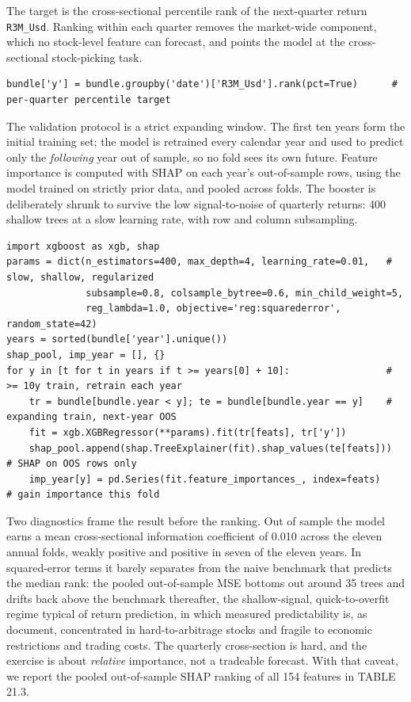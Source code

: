 The target is the cross-sectional percentile rank of the next-quarter return \texttt{R3M\_Usd}. Ranking within each quarter removes the market-wide component, which no stock-level feature can forecast, and points the model at the cross-sectional stock-picking task.

\begin{verbatim}
bundle['y'] = bundle.groupby('date')['R3M_Usd'].rank(pct=True)      # per-quarter percentile target
\end{verbatim}

The validation protocol is a strict expanding window. The first ten years form the initial training set; the model is retrained every calendar year and used to predict only the \textit{following} year out of sample, so no fold sees its own future. Feature importance is computed with SHAP on each year's out-of-sample rows, using the model trained on strictly prior data, and pooled across folds. The booster is deliberately shrunk to survive the low signal-to-noise of quarterly returns: 400 shallow trees at a slow learning rate, with row and column subsampling.

\begin{verbatim}
import xgboost as xgb, shap
params = dict(n_estimators=400, max_depth=4, learning_rate=0.01,   # slow, shallow, regularized
              subsample=0.8, colsample_bytree=0.6, min_child_weight=5,
              reg_lambda=1.0, objective='reg:squarederror', random_state=42)
years = sorted(bundle['year'].unique())
shap_pool, imp_year = [], {}
for y in [t for t in years if t >= years[0] + 10]:                 # >= 10y train, retrain each year
    tr = bundle[bundle.year < y]; te = bundle[bundle.year == y]    # expanding train, next-year OOS
    fit = xgb.XGBRegressor(**params).fit(tr[feats], tr['y'])
    shap_pool.append(shap.TreeExplainer(fit).shap_values(te[feats]))    # SHAP on OOS rows only
    imp_year[y] = pd.Series(fit.feature_importances_, index=feats)      # gain importance this fold
\end{verbatim}

Two diagnostics frame the result before the ranking. Out of sample the model earns a mean cross-sectional information coefficient of 0.010 across the eleven annual folds, weakly positive and positive in seven of the eleven years. In squared-error terms it barely separates from the naive benchmark that predicts the median rank: the pooled out-of-sample MSE bottoms out around 35 trees and drifts back above the benchmark thereafter, the shallow-signal, quick-to-overfit regime typical of return prediction, in which measured predictability is, as \cite{avramov2023machine} document, concentrated in hard-to-arbitrage stocks and fragile to economic restrictions and trading costs. The quarterly cross-section is hard, and the exercise is about \textit{relative} importance, not a tradeable forecast. With that caveat, we report the pooled out-of-sample SHAP ranking of all 154 features in TABLE 21.3.


